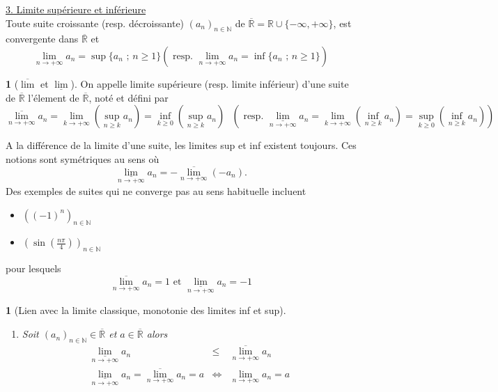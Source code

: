 \documentclass[8pt,notheorems]{beamer}
\def \N{\mathbb N}
\newcommand{\RL}{\mathbb{R}}
\newtheorem{prop}{\translate{Proposition}}
\theoremstyle{definition}
\newtheorem{definition}{\translate{Definition}}
\theoremstyle{example}
\theoremstyle{mystyle}
\theoremstyle{plain}
\begin{document}
\begin{frame}[allowframebreaks]
\underline{3. Limite supérieure et inférieure}\\
Toute suite croissante (resp. décroissante) $(a_n)_{n\in\N}$ de $\overline{\RL} = \RL\cup\{-\infty, +\infty\}$, est convergente dans $\overline{\RL}$ et
$$
\underset{n\rightarrow+\infty}{\lim} a_n=\sup\{a_n\text{ ; }n\geq1\}\left(\text{ resp. }\underset{n\rightarrow+\infty}{\lim} a_n=\inf\{a_n\text{ ; }n\geq1\}\right)
$$
\begin{definition}[$\overline{\lim}$ et $\underline{\lim}$]
On appelle limite supérieure (resp. limite inférieur) d'une suite de $\overline{\RL}$ l'élement de $\overline{\RL}$, noté et défini par
$$
\underset{n\rightarrow +\infty}{\overline{\lim}}a_n=
\underset{k\rightarrow +\infty}{\lim}\left(\underset{n\geq k}{\sup} a_n\right)= \underset{k\geq0}{\inf}\left(\underset{n\geq k}{\sup} a_n\right)
\text{ }\left(\text{ resp. }\underset{n\rightarrow +\infty}{\underline{\lim}}a_n
=\underset{k\rightarrow +\infty}{\lim}\left(\underset{n\geq k}{\inf} a_n\right) = \underset{k\geq0}{\sup}\left(\underset{n\geq k}{\inf} a_n\right) \right)
$$
\end{definition}
A la différence de la limite d'une suite, les limites sup et inf existent toujours. Ces notions sont symétriques au sens où
$$\underset{n\rightarrow+\infty}{\underline{\lim}}a_n=-\underset{n\rightarrow+\infty}{\overline{\lim}}(-a_n).$$
Des exemples de suites qui ne converge pas au sens habituelle incluent
\begin{itemize}
\item $\left((-1)^{n}\right)_{n\in\N}$
\item $\left(\sin\left(\frac{n\pi}{4}\right)\right)_{n\in\N}$
\end{itemize}
pour lesquels
$$
\underset{n\rightarrow+\infty}{\overline{\lim}}a_n=1\text{ et }\underset{n\rightarrow+\infty}{\underline{\lim}}a_n=-1
$$
\begin{prop}[Lien avec la limite classique, monotonie des limites inf et sup]\label{prop:Monotonielimsupinf}
\begin{enumerate}
\item Soit $(a_{n})_{n\in\N}\in \overline{\RL}$ et $a\in\overline{\RL}$ alors
\begin{eqnarray*}
\underset{n\rightarrow+\infty}{\underline{\lim}}a_n&\leq& \underset{n\rightarrow+\infty}{\overline{\lim}}a_n\\
 \underset{n\rightarrow+\infty}{\underline{\lim}}a_n= \underset{n\rightarrow+\infty}{\overline{\lim}}a_n=a&\Leftrightarrow&\underset{n\rightarrow+\infty}{\lim}a_n=a\\

\end{eqnarray*}
\end{enumerate}
\end{prop}
\end{frame}
\end{document}
